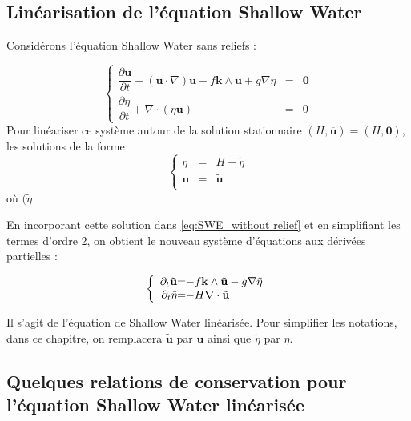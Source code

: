 \subsection{Linéarisation de l'équation Shallow Water}

Considérons l'équation Shallow Water sans reliefs :

\begin{equation}
\label{eq:SWE_without relief}
\left\lbrace
\begin{array}{rcl}
\dfrac{\partial \mathbf{u}}{\partial t} + \left( \mathbf{u} \cdot \nabla \right) \mathbf{u} + f \mathbf{k} \wedge \mathbf{u} + g \nabla \eta & = & \mathbf{0} \\
\dfrac{\partial \eta}{\partial t} + \nabla \cdot \left( \eta \mathbf{u} \right) & = & 0
\end{array}
\right.
\end{equation}
Pour linéariser ce système autour de la solution stationnaire $(H, \overline{\mathbf{u}}) = (H,\mathbf{0})$, les solutions de la forme
\begin{equation}
\left\lbrace
\begin{array}{rcl}
\eta & = & H + \tilde{\eta} \\
\mathbf{u} & = & \tilde{\mathbf{u}} \\
\end{array}
\right.
\end{equation}
où $(\tilde{\eta}$

En incorporant cette solution dans \eqref{eq:SWE_without relief} et en simplifiant les termes d'ordre 2, on obtient le nouveau système d'équations aux dérivées partielles :

\begin{equation}
\left\lbrace
\begin{array}{r @{=} l}
\partial_t \tilde{\mathbf{u}}& -f \mathbf{k} \wedge \tilde{\mathbf{u}} - g \nabla \tilde{\eta}\\
\partial_t \tilde{\eta} & -H \nabla \cdot \tilde{\mathbf{u}}
\end{array}
\right.
\end{equation}

Il s'agit de l'équation de Shallow Water linéarisée.
Pour simplifier les notations, dans ce chapitre, on remplacera $\tilde{\mathbf{u}}$ par $\mathbf{u}$ ainsi que $\tilde{\eta}$ par $\eta$.





\subsection{Quelques relations de conservation pour l'équation Shallow Water linéarisée}

